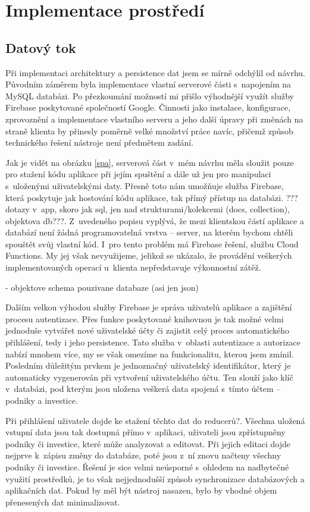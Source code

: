 \section{Implementace prostředí}

\subsection{Datový tok}
Při implementaci architektury a persistence dat jsem se mírně odchýlil od návrhu. Původním záměrem byla implementace vlastní serverové části s~napojením na MySQL databázi. Po přezkoumání možností mi přišlo výhodnější využít služby Firebase poskytované společností Google. Činnosti jako instalace, konfigurace, zprovoznění a implementace vlastního serveru a jeho další úpravy při změnách na straně klienta by přinesly poměrně velké množství práce navíc, přičemž způsob technického řešení nástroje není předmětem zadání.

Jak je vidět na obrázku \ref{spa}, serverová část v~mém návrhu měla sloužit pouze pro stažení kódu aplikace při jejím spuštění a dále už jen pro manipulaci s~uloženými uživatelskými daty. Přesně toto nám umožňuje služba Firebase, která poskytuje jak hostování kódu aplikace, tak přímý přístup na databázi. ???dotazy v~app, skoro jak sql, jen nad strukturami/kolekcemi (docs, collection), objektova db???. Z~uvedeného popisu vyplývá, že mezi klientskou částí aplikace a databází není žádná programovatelná vrstva -- server, na kterém bychom chtěli spouštět svůj vlastní kód. I~pro tento problém má Firebase řešení, službu Cloud Functions. My jej však nevyužijeme, jelikož se ukázalo, že provádění veškerých implementovaných operací u~klienta nepředstavuje výkonnostní zátěž.

- objektove schema pouzivane databaze (asi jen json)

Dalším velkou výhodou služby Firebase je správa uživatelů aplikace a zajištění procesu autentizace. Přes funkce poskytované knihovnou je tak možné velmi jednoduše vytvářet nové uživatelské účty či zajistit celý proces automatického přihlášení, tedy i jeho persistence. Tato služba v~oblasti autentizace a autorizace nabízí mnohem více, my se však omezíme na funkcionalitu, kterou jsem zmínil. Posledním důležitým prvkem je jednoznačný uživatelský identifikátor, který je automaticky vygenerován při vytvoření uživatelského účtu. Ten slouží jako klíč v~databázi, pod kterým jsou uložena veškerá data spojená s~tímto účtem -- podniky a investice. 

Při přihlášení uživatele dojde ke stažení těchto dat do reducerů?. Všechna uložená vstupní data jsou tak dostupná přímo v~aplikaci, uživateli jsou zpřístupněny podniky či investice, které může analyzovat a editovat. Při jejich editaci dojde nejprve k~zápisu změny do databáze, poté jsou z~ní znovu načteny všechny podniky či investice. Řešení je sice velmi neúsporné s~ohledem na nadbytečné využití prostředků, je to však nejjednodušší způsob synchronizace databázových a aplikačních dat. Pokud by měl být nástroj nasazen, bylo by vhodné objem přenesených dat minimalizovat. 

